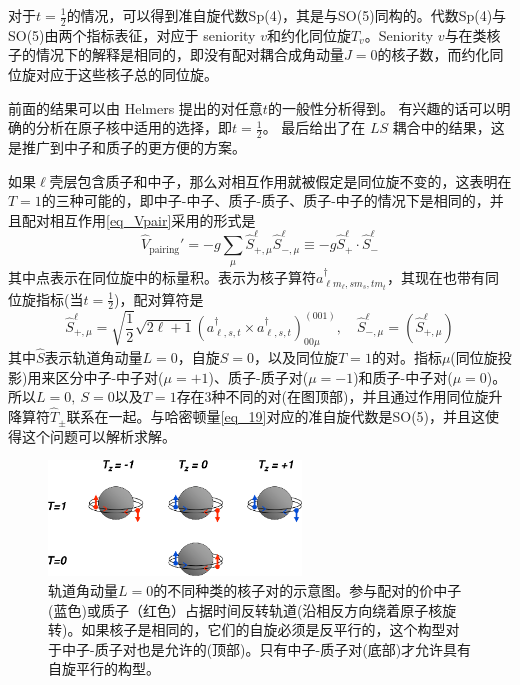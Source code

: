 对于$t=\frac{1}{2}$的情况，可以得到准自旋代数Sp(4)，其是与SO(5)同构的。代数Sp(4)与SO(5)由两个指标表征，对应于 seniority $v$和约化同位旋$T_v$。Seniority $v$与在类核子的情况下的解释是相同的，即没有配对耦合成角动量$J=0$的核子数，而约化同位旋对应于这些核子总的同位旋。

前面的结果可以由 Helmers 提出的对任意$t$的一般性分析得到。 有兴趣的话可以明确的分析在原子核中适用的选择，即$t=\frac{1}{2}$。 最后给出了在 $LS$ 耦合中的结果，这是推广到中子和质子的更方便的方案。

如果$\ell$壳层包含质子和中子，那么对相互作用就被假定是同位旋不变的，这表明在$T=1$的三种可能的，即中子-中子、质子-质子、质子-中子的情况下是相同的，并且配对相互作用\ref{eq_Vpair}采用的形式是
\begin{equation}\label{eq_19}
\hat{V}_\textrm{pairing}'=-g\sum_\mu\hat{S}_{+,\mu}^\ell\hat{S}_{-,\mu}^\ell\equiv-g\hat{S}_+^\ell\cdot\hat{S}_-^\ell
\end{equation}
其中点表示在同位旋中的标量积。表示为核子算符$a^\dag_{\ell m_\ell,sm_s,tm_t}$，其现在也带有同位旋指标(当$t=\frac{1}{2}$)，配对算符是
\begin{equation}\label{eq_20}
\hat{S}^\ell_{+,\mu}=\sqrt{\frac{1}{2}}\sqrt{2\ell+1}(a^\dag_{\ell,s,t}\times a^\dag_{\ell,s,t})^{(001)}_{00\mu},\quad\hat{S}^\ell_{-,\mu}=\left(\hat{S}^\ell_{+,\mu}\right)
\end{equation}
其中$\hat{S}$表示轨道角动量$L=0$，自旋$S=0$，以及同位旋$T=1$的对。指标$\mu$(同位旋投影)用来区分中子-中子对($\mu=+1$)、质子-质子对($\mu=-1$)和质子-中子对($\mu=0$)。所以$L=0,\ S=0$以及$T=1$存在3种不同的对(在图顶部)，并且通过作用同位旋升降算符$\hat{T}_\pm$联系在一起。与哈密顿量\ref{eq_19}对应的准自旋代数是SO(5)，并且这使得这个问题可以解析求解。
\begin{figure}[H]
\centering
\includegraphics[width=0.6\textwidth]{figure/F_pairs.png}
\caption{轨道角动量$L=0$的不同种类的核子对的示意图。参与配对的价中子(蓝色)或质子（红色）占据时间反转轨道(沿相反方向绕着原子核旋转)。如果核子是相同的，它们的自旋必须是反平行的，这个构型对于中子-质子对也是允许的(顶部)。只有中子-质子对(底部)才允许具有自旋平行的构型。\label{F_pairs}}
\end{figure}

